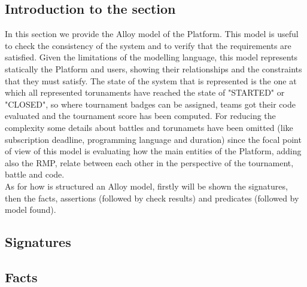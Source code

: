 \newcommand{\showCode}[2]{
    
}
\subsection*{Introduction to the section}
In this section we provide the Alloy model of the Platform. This model is useful to check the consistency of the system and to verify that the requirements are satisfied. Given the limitations of the modelling language, this model represents statically the Platform and users, showing their relationships and the constraints that they must satisfy. The state of the system that is represented is the one at which all represented torunaments have reached the state of "STARTED" or "CLOSED", so where tournament badges can be assigned, teams got their code evaluated and the tournament score has been computed. For reducing the complexity some details about battles and torunamets have been omitted (like subscription deadline, programming language and duration) since the focal point of view of this model is evaluating how the main entities of the Platform, adding also the RMP, relate between each other in the perspective of the tournament, battle and code.\\
As for how is structured an Alloy model, firstly will be shown the signatures, then the facts, assertions (followed by check results) and predicates (followed by model found).

\subsection{Signatures}
\showCode{4}{76}
\subsection{Facts}
\showCode{82}{236}
